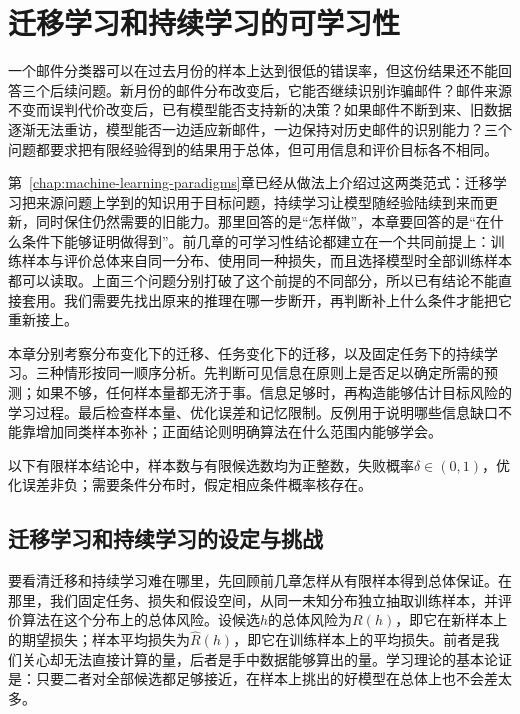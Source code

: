 \chapter{迁移学习和持续学习的可学习性}
\label{chap:transfer-learning-theory}

一个邮件分类器可以在过去月份的样本上达到很低的错误率，但这份结果还不能回答三个后续问题。新月份的邮件分布改变后，它能否继续识别诈骗邮件？邮件来源不变而误判代价改变后，已有模型能否支持新的决策？如果邮件不断到来、旧数据逐渐无法重访，模型能否一边适应新邮件，一边保持对历史邮件的识别能力？三个问题都要求把有限经验得到的结果用于总体，但可用信息和评价目标各不相同。

第~\ref{chap:machine-learning-paradigms}章已经从做法上介绍过这两类范式：迁移学习把来源问题上学到的知识用于目标问题，持续学习让模型随经验陆续到来而更新，同时保住仍然需要的旧能力。那里回答的是“怎样做”，本章要回答的是“在什么条件下能够证明做得到”。前几章的可学习性结论都建立在一个共同前提上：训练样本与评价总体来自同一分布、使用同一种损失，而且选择模型时全部训练样本都可以读取。上面三个问题分别打破了这个前提的不同部分，所以已有结论不能直接套用。我们需要先找出原来的推理在哪一步断开，再判断补上什么条件才能把它重新接上。

本章分别考察分布变化下的迁移、任务变化下的迁移，以及固定任务下的持续学习。三种情形按同一顺序分析。先判断可见信息在原则上是否足以确定所需的预测；如果不够，任何样本量都无济于事。信息足够时，再构造能够估计目标风险的学习过程。最后检查样本量、优化误差和记忆限制。反例用于说明哪些信息缺口不能靠增加同类样本弥补；正面结论则明确算法在什么范围内能够学会。

以下有限样本结论中，样本数与有限候选数均为正整数，失败概率$\delta\in(0,1)$，优化误差非负；需要条件分布时，假定相应条件概率核存在。

\section{迁移学习和持续学习的设定与挑战}
\label{sec:transfer-learning-setting}

要看清迁移和持续学习难在哪里，先回顾前几章怎样从有限样本得到总体保证。在那里，我们固定任务、损失和假设空间，从同一未知分布独立抽取训练样本，并评价算法在这个分布上的总体风险。设候选$h$的总体风险为$R(h)$，即它在新样本上的期望损失；样本平均损失为$\widehat R(h)$，即它在训练样本上的平均损失。前者是我们关心却无法直接计算的量，后者是手中数据能够算出的量。学习理论的基本论证是：只要二者对全部候选都足够接近，在样本上挑出的好模型在总体上也不会差太多。


